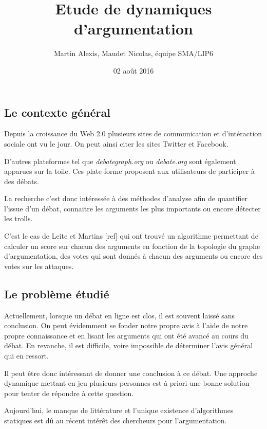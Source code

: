 \documentclass[11pt]{article}
\title{Etude de dynamiques d'argumentation}
\author{Martin Alexis, Maudet Nicolas, équipe SMA/LIP6}
\date{02 août 2016}
\theoremstyle{defi}
\theoremstyle{not}
\theoremstyle{prob}
\begin{document}
\renewcommand{\proofname}{Démonstration}
\maketitle
%



\subsection*{Le contexte général}
  Depuis la croissance du Web 2.0 plusieurs sites de communication et d'intéraction sociale ont vu le jour. On peut ainsi citer les sites Twitter et Facebook.

  D'autres plateformes tel que \emph{debategraph.org} ou \emph{debate.org} sont également apparues sur la toile. Ces plate-forme proposent aux utilisateurs de participer à des débats.

  La recherche c'est donc intéressée à des méthodes d'analyse afin de quantifier l'issue d'un débat, connaitre les arguments les plus importants ou encore détecter les trolls.

  C'est le cas de Leite et Martins [ref] qui ont trouvé un algorithme permettant de calculer un score sur chacun des arguments en fonction de la topologie du graphe d'argumentation, des votes qui sont donnés à chacun des arguments ou encore des votes sur les attaques.


\subsection*{Le problème étudié}
  Actuellement, lorsque un débat en ligne est clos, il est souvent laissé sans conclusion.
  On peut évidemment se fonder notre propre avis à l'aide de notre propre connaissance et en lisant les arguments qui ont été avancé au cours du débat.
  En revanche, il est difficile, voire impossible de déterminer l'avis général qui en ressort.

  Il peut être donc intéressant de donner une conclusion à ce débat.
  Une approche dynamique mettant en jeu plusieurs personnes est à priori une bonne solution pour tenter de répondre à cette question.

  Aujourd'hui, le manque de littérature et l'unique existence d'algorithmes statiques est dû au récent intérêt des chercheurs pour l'argumentation.
\end{document}
